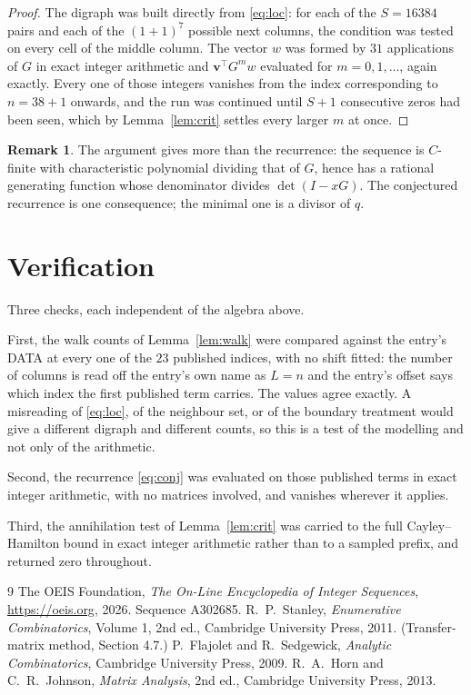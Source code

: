 \documentclass[11pt,a4paper]{article}
\theoremstyle{plain}
\theoremstyle{definition}
\newtheorem{remark}[theorem]{Remark}
\begin{document}
\begin{proof}
The digraph was built directly from \eqref{eq:loc}: for each of the $S=16384$ pairs and each
of the $(1+1)^{7}$ possible next columns, the condition was tested on every cell of
the middle column. The vector $w$ was formed by $31$ applications of $G$ in exact integer
arithmetic and $\mathbf{v}^{\!\top}G^{m}w$ evaluated for $m=0,1,\dots$, again exactly.
Every one of those integers vanishes from the index corresponding to $n=38+1$ onwards,
and the run was continued until $S+1$ consecutive zeros had been seen, which by
Lemma~\ref{lem:crit} settles every larger $m$ at once.
\end{proof}

\begin{remark}
The argument gives more than the recurrence: the sequence is $C$-finite with characteristic
polynomial dividing that of $G$, hence has a rational generating function whose denominator
divides $\det(I-xG)$. The conjectured recurrence is one consequence; the minimal one is a
divisor of $q$.
\end{remark}

\section{Verification}

Three checks, each independent of the algebra above.

First, the walk counts of Lemma~\ref{lem:walk} were compared against the entry's DATA at
every one of the $23$ published indices, with no shift fitted: the number of columns is
read off the entry's own name as $L=n$ and the entry's offset says which index the first
published term carries. The values agree exactly. A misreading of \eqref{eq:loc}, of the
neighbour set, or of the boundary treatment would give a different digraph and different
counts, so this is a test of the modelling and not only of the arithmetic.

Second, the recurrence \eqref{eq:conj} was evaluated on those published terms in exact
integer arithmetic, with no matrices involved, and vanishes wherever it applies.

Third, the annihilation test of Lemma~\ref{lem:crit} was carried to the full
Cayley--Hamilton bound in exact integer arithmetic rather than to a sampled prefix, and
returned zero throughout.

\begin{thebibliography}{9}
 The OEIS Foundation, \emph{The On-Line Encyclopedia of Integer
Sequences}, \url{https://oeis.org}, 2026. Sequence A302685.
 R.~P.~Stanley, \emph{Enumerative Combinatorics}, Volume 1, 2nd ed.,
Cambridge University Press, 2011. (Transfer-matrix method, Section 4.7.)
 P.~Flajolet and R.~Sedgewick, \emph{Analytic Combinatorics}, Cambridge
University Press, 2009.
 R.~A.~Horn and C.~R.~Johnson, \emph{Matrix Analysis}, 2nd ed., Cambridge
University Press, 2013.
\end{thebibliography}
\end{document}
